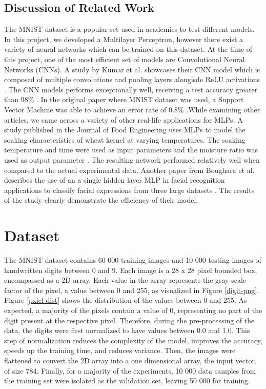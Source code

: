 \documentclass[11pt]{homework}
\begin{document}
\subsection{Discussion of Related Work}
The MNIST dataset is a popular set used in academics to test different models. In this project, we developed a Multilayer Perceptron, however there exist a variety of neural networks which can be trained on this dataset. At the time of this project, one of the most efficient set of models are Convolutional Neural Networks (CNNs). A study by Kumar et al. showcases their CNN model which is composed of multiple convolutions and pooling layers alongisde ReLU activations \cite{garg2019validation}. The CNN models performs exceptionally well, receiving a test accuracy greater than 98\% \cite{garg2019validation}. In the original paper where MNIST dataset was used, a Support Vector Machine was able to achieve an error rate of 0.8\% \cite{lecun1998gradient}.While examining other articles, we came across a variety of other real-life applications for MLPs. A study published in the Journal of Food Engineering uses MLPs to model the soaking characteristics of wheat kernel at varying temperatures. The soaking temperature and time were used as input parameters and the moisture ratio was used as output parameter \cite{kashaninejad2009modeling}. The resulting network performed relatively well when compared to the actual experimental data. Another paper from Boughara et al. describes the use of an a single hidden layer MLP in facial recognition applications to classify facial expressions from three large datasets \cite{boughrara2016facial}. The results of the study clearly demonstrate the efficiency of their model. 


\section{Dataset}
The MNIST dataset contains 60 000 training images and 10 000 testing images of handwritten digits between 0 and 9. Each image is a 28 x 28 pixel bounded box, encompassed as a 2D array. Each value in the array represents the gray-scale factor of the pixel, a value between 0 and 255, as visualized in Figure \ref{digit-png}.  Figure \ref{pxiel-dist} shows the distribution of the values between 0 and 255. As expected, a majority of the pixels contain a value of 0, representing no part of the digit present at the respective pixel. Therefore, during the pre-processing of the data, the digits were first normalized to have values between 0.0 and 1.0. This step of normalization reduces the complexity of the model, improves the accuracy, speeds up the training time, and reduces variance. Then, the images were flattened to convert the 2D array into a one dimensional array, the input vector, of size 784. Finally, for a majority of the experiments, 10 000 data samples from the training set were isolated as the validation set, leaving 50 000 for training.
\end{document}
